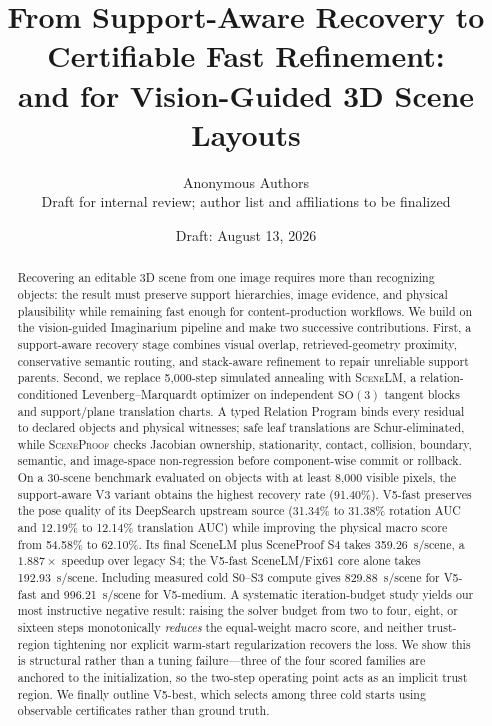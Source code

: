 \documentclass[10pt,twocolumn]{article}
\title{From Support-Aware Recovery to Certifiable Fast Refinement:\\
\method{} and \proofsys{} for Vision-Guided 3D Scene Layouts}
\author{Anonymous Authors\\
\small Draft for internal review; author list and affiliations to be finalized}
\date{Draft: August 13, 2026}
\newcommand{\method}{\textsc{SceneLM}}
\newcommand{\proofsys}{\textsc{SceneProof}}
\begin{document}
\maketitle

\begin{abstract}
Recovering an editable 3D scene from one image requires more than recognizing
objects: the result must preserve support hierarchies, image evidence, and
physical plausibility while remaining fast enough for content-production
workflows.  We build on the vision-guided Imaginarium pipeline and make two
successive contributions.  First, a support-aware recovery stage combines
visual overlap, retrieved-geometry proximity, conservative semantic routing,
and stack-aware refinement to repair unreliable support parents.  Second, we
replace 5,000-step simulated annealing with \method{}, a relation-conditioned
Levenberg--Marquardt optimizer on independent $\mathrm{SO}(3)$ tangent blocks
and support/plane translation charts.  A typed Relation Program binds every
residual to declared objects and physical witnesses; safe leaf translations
are Schur-eliminated, while \proofsys{} checks Jacobian ownership,
stationarity, contact, collision, boundary, semantic, and image-space
non-regression before component-wise commit or rollback.  On a 30-scene
benchmark evaluated on objects with at least 8,000 visible pixels, the
support-aware V3 variant obtains the highest recovery rate (91.40\%).  V5-fast
preserves the pose quality of its DeepSearch upstream source (31.34\% to
31.38\% rotation AUC and 12.19\% to 12.14\% translation AUC) while improving
the physical macro score from 54.58\% to 62.10\%.  Its final SceneLM plus
SceneProof S4 takes 359.26~s/scene, a $1.887\times$ speedup over legacy S4;
the V5-fast SceneLM/Fix61 core alone takes 192.93~s/scene.  Including measured
cold S0--S3 compute gives 829.88~s/scene for V5-fast and 996.21~s/scene for
V5-medium.  A systematic iteration-budget study yields our most instructive
negative result: raising the solver budget from two to four, eight, or sixteen
steps monotonically \emph{reduces} the equal-weight macro score, and neither
trust-region tightening nor explicit warm-start regularization recovers the
loss.  We show this is structural rather than a tuning failure---three of the
four scored families are anchored to the initialization, so the two-step
operating point acts as an implicit trust region.  We finally outline V5-best,
which selects among three cold starts using observable certificates rather
than ground truth.
\end{abstract}
\end{document}
